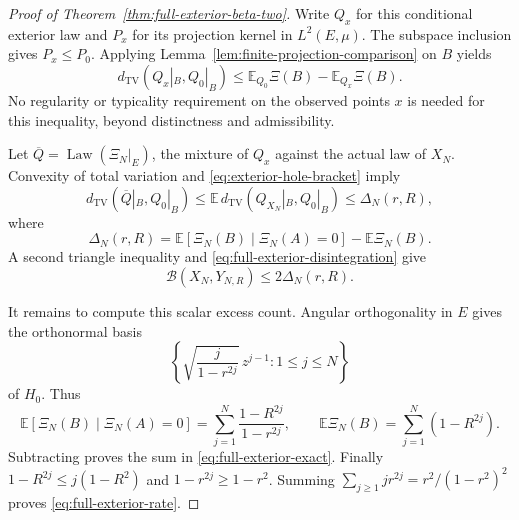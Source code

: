\documentclass[11pt]{article}
\theoremstyle{remark}\newtheorem{remark}[theorem]{Remark}
\begin{document}
\begin{proof}[Proof of Theorem~\ref{thm:full-exterior-beta-two}]
Write $Q_x$ for this conditional exterior law and $P_x$ for its
projection kernel in $L^2(E,\mu)$.  The subspace inclusion gives
$P_x\le P_0$.  Applying Lemma~\ref{lem:finite-projection-comparison} on $B$ yields
\begin{equation}\label{eq:exterior-hole-bracket}
 d_{\mathrm{TV}}(Q_x|_B,Q_0|_B)
 \le \mathbb E_{Q_0}\Xi(B)-\mathbb E_{Q_x}\Xi(B).
\end{equation}
No regularity or typicality requirement on the observed points $x$ is
needed for this inequality, beyond distinctness and admissibility.

Let $\overline Q=\operatorname{Law}(\Xi_N|_E)$, the mixture of $Q_x$
against the actual law of $X_N$.  Convexity of total variation and
\eqref{eq:exterior-hole-bracket} imply
\[
 d_{\mathrm{TV}}(\overline Q|_B,Q_0|_B)
 \le\mathbb E\,d_{\mathrm{TV}}(Q_{X_N}|_B,Q_0|_B)
 \le \Delta_N(r,R),
\]
where
\[
 \Delta_N(r,R)=
       \mathbb E[\Xi_N(B)\mid\Xi_N(A)=0]-\mathbb E\Xi_N(B).
\]
A second triangle inequality and
\eqref{eq:full-exterior-disintegration} give
\begin{equation}\label{eq:full-exterior-hole-reduction}
 \mathcal B(X_N,Y_{N,R})\le2\Delta_N(r,R).
\end{equation}

It remains to compute this scalar excess count.  Angular orthogonality
in $E$ gives the orthonormal basis
\[
 \left\{\sqrt{\frac{j}{1-r^{2j}}}\,z^{j-1}:1\le j\le N\right\}
\]
of $H_0$.  Thus
\[
 \mathbb E[\Xi_N(B)\mid\Xi_N(A)=0]
   =\sum_{j=1}^N\frac{1-R^{2j}}{1-r^{2j}},
 \qquad
 \mathbb E\Xi_N(B)=\sum_{j=1}^N(1-R^{2j}).
\]
Subtracting proves the sum in \eqref{eq:full-exterior-exact}.
Finally $1-R^{2j}\le j(1-R^2)$ and
$1-r^{2j}\ge1-r^2$.  Summing
$\sum_{j\ge1}j r^{2j}=r^2/(1-r^2)^2$ proves
\eqref{eq:full-exterior-rate}.
\end{proof}
\end{document}
